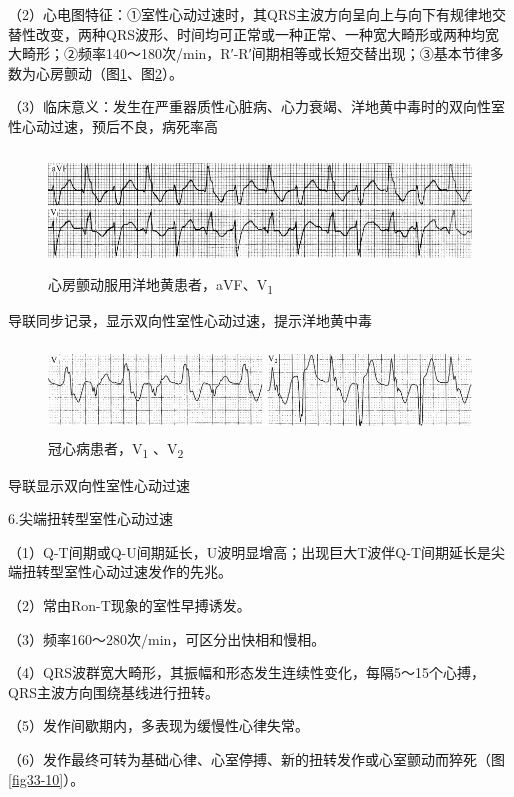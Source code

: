 （2）心电图特征：①室性心动过速时，其QRS主波方向呈向上与向下有规律地交替性改变，两种QRS波形、时间均可正常或一种正常、一种宽大畸形或两种均宽大畸形；②频率140～180次/min，R′-R′间期相等或长短交替出现；③基本节律多数为心房颤动（图\ref{fig33-8}、图\ref{fig33-9}）。

（3）临床意义：发生在严重器质性心脏病、心力衰竭、洋地黄中毒时的双向性室性心动过速，预后不良，病死率高

\begin{figure}[!htbp]
 \centering
 \includegraphics[width=5.58333in,height=1.25in]{./images/Image00537.jpg}
 \captionsetup{justification=centering}
 \caption{心房颤动服用洋地黄患者，aVF、V\textsubscript{1}}
 \label{fig33-8}
  \end{figure} 
导联同步记录，显示双向性室性心动过速，提示洋地黄中毒

\begin{figure}[!htbp]
 \centering
 \includegraphics[width=5.58333in,height=0.9375in]{./images/Image00538.jpg}
 \captionsetup{justification=centering}
 \caption{冠心病患者，V\textsubscript{1} 、V\textsubscript{2}}
 \label{fig33-9}
  \end{figure} 
导联显示双向性室性心动过速

6.尖端扭转型室性心动过速

（1）Q-T间期或Q-U间期延长，U波明显增高；出现巨大T波伴Q-T间期延长是尖端扭转型室性心动过速发作的先兆。

（2）常由Ron-T现象的室性早搏诱发。

（3）频率160～280次/min，可区分出快相和慢相。

（4）QRS波群宽大畸形，其振幅和形态发生连续性变化，每隔5～15个心搏，QRS主波方向围绕基线进行扭转。

（5）发作间歇期内，多表现为缓慢性心律失常。

（6）发作最终可转为基础心律、心室停搏、新的扭转发作或心室颤动而猝死（图\ref{fig33-10}）。

